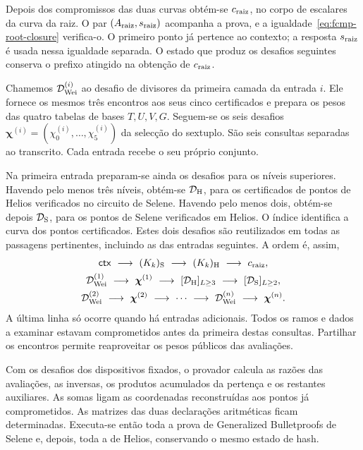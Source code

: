 Depois dos compromissos das duas curvas obtém-se
\(c_{\rm raiz}\), no corpo de escalares da curva da raiz.
O par \((A_{\rm raiz},s_{\rm raiz})\) acompanha a prova,
e a igualdade~\eqref{eq:fcmp-root-closure} verifica-o.
O primeiro ponto já pertence ao contexto; a resposta
\(s_{\rm raiz}\) é usada nessa igualdade separada.
O estado que produz os desafios seguintes conserva o prefixo
atingido na obtenção de \(c_{\rm raiz}\).

Chamemos \(\mathcal D_{\rm Wei}^{(i)}\) ao desafio de
divisores da primeira camada da entrada \(i\). Ele fornece
os mesmos três encontros aos seus cinco certificados e
prepara os pesos das quatro tabelas de bases \(T,U,V,G\).
Seguem-se os seis desafios
\(\boldsymbol\chi^{(i)}=(\chi_0^{(i)},\ldots,\chi_5^{(i)})\)
da selecção do sextuplo. São seis consultas separadas ao
transcrito. Cada entrada recebe o seu próprio conjunto.

Na primeira entrada preparam-se ainda os desafios para os
níveis superiores. Havendo pelo menos três níveis, obtém-se
\(\mathcal D_{\rm H}\), para os certificados de pontos
de Helios verificados no circuito de Selene. Havendo pelo
menos dois, obtém-se depois \(\mathcal D_{\rm S}\), para
os pontos de Selene verificados em Helios. O índice identifica
a curva dos pontos certificados. Estes dois desafios são
reutilizados em todas as passagens pertinentes, incluindo
as das entradas seguintes. A ordem é, assim,
\[
 \begin{gathered}
 \mathsf{ctx}\ \longrightarrow\
 (K_k)_{\rm S}\ \longrightarrow\ (K_k)_{\rm H}
 \ \longrightarrow\ c_{\rm raiz},\\
 \mathcal D_{\rm Wei}^{(1)}\ \longrightarrow\
 \boldsymbol\chi^{(1)}\ \longrightarrow\
 [\mathcal D_{\rm H}]_{L\geq3}\ \longrightarrow\
 [\mathcal D_{\rm S}]_{L\geq2},\\
 \mathcal D_{\rm Wei}^{(2)}\ \longrightarrow\
 \boldsymbol\chi^{(2)}\ \longrightarrow\ \cdots
 \ \longrightarrow\ \mathcal D_{\rm Wei}^{(n)}
 \ \longrightarrow\ \boldsymbol\chi^{(n)}.
 \end{gathered}
\]
A última linha só ocorre quando há entradas adicionais.
Todos os ramos e dados a examinar estavam comprometidos antes
da primeira destas consultas. Partilhar os encontros permite
reaproveitar os pesos públicos das avaliações.

Com os desafios dos dispositivos fixados, o provador calcula
as razões das avaliações, as inversas, os produtos acumulados
da pertença e os restantes auxiliares. As somas ligam as
coordenadas reconstruídas aos pontos já comprometidos.
As matrizes das duas declarações aritméticas ficam determinadas.
Executa-se então toda a prova de Generalized Bulletproofs
de Selene e, depois, toda a de Helios, conservando o mesmo
estado de hash.

